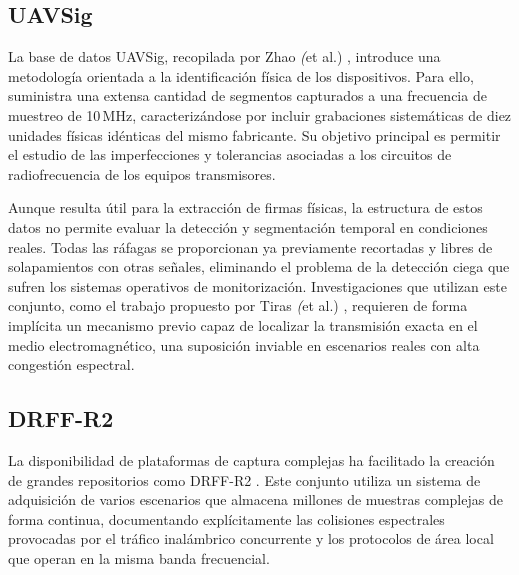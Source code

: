 \subsection{UAVSig}
\label{subsec:uavsig}

La base de datos UAVSig, recopilada por Zhao \textit(et al.) \cite{zhao_drone_2024}, introduce una metodología orientada a la identificación física de los dispositivos. Para ello, suministra una extensa cantidad de segmentos capturados a una frecuencia de muestreo de 10\,MHz, caracterizándose por incluir grabaciones sistemáticas de diez unidades físicas idénticas del mismo fabricante. Su objetivo principal es permitir el estudio de las imperfecciones y tolerancias asociadas a los circuitos de radiofrecuencia de los equipos transmisores.

Aunque resulta útil para la extracción de firmas físicas, la estructura de estos datos no permite evaluar la detección y segmentación temporal en condiciones reales. Todas las ráfagas se proporcionan ya previamente recortadas y libres de solapamientos con otras señales, eliminando el problema de la detección ciega que sufren los sistemas operativos de monitorización. Investigaciones que utilizan este conjunto, como el trabajo propuesto por Tiras \textit(et al.) \cite{tiras_crossrf_2025}, requieren de forma implícita un mecanismo previo capaz de localizar la transmisión exacta en el medio electromagnético, una suposición inviable en escenarios reales con alta congestión espectral.

\subsection{DRFF-R2}
\label{subsec:drff_r2}

La disponibilidad de plataformas de captura complejas ha facilitado la creación de grandes repositorios como DRFF-R2 \cite{zheng_multi-scenario_2026}. Este conjunto utiliza un sistema de adquisición de varios escenarios que almacena millones de muestras complejas de forma continua, documentando explícitamente las colisiones espectrales provocadas por el tráfico inalámbrico concurrente y los protocolos de área local que operan en la misma banda frecuencial.

